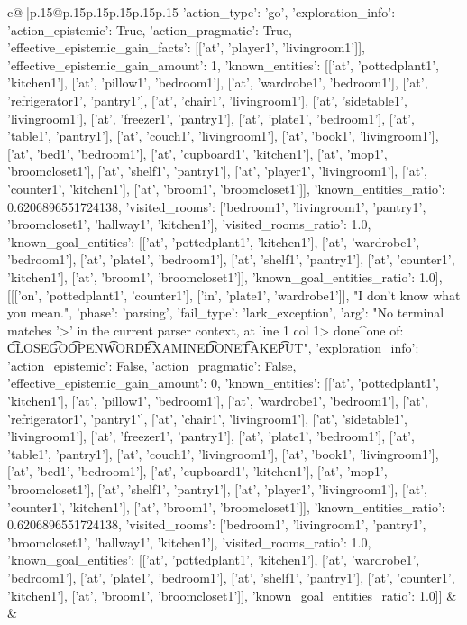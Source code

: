 \documentclass{article}
\begin{document}
{\begin{supertabular}{c@{$\;$}|p{.15\linewidth}@{}p{.15\linewidth}p{.15\linewidth}p{.15\linewidth}p{.15\linewidth}p{.15\linewidth}}
{{{{'action_type': 'go', 'exploration_info': {'action_epistemic': True, 'action_pragmatic': True, 'effective_epistemic_gain_facts': [['at', 'player1', 'livingroom1']], 'effective_epistemic_gain_amount': 1, 'known_entities': [['at', 'pottedplant1', 'kitchen1'], ['at', 'pillow1', 'bedroom1'], ['at', 'wardrobe1', 'bedroom1'], ['at', 'refrigerator1', 'pantry1'], ['at', 'chair1', 'livingroom1'], ['at', 'sidetable1', 'livingroom1'], ['at', 'freezer1', 'pantry1'], ['at', 'plate1', 'bedroom1'], ['at', 'table1', 'pantry1'], ['at', 'couch1', 'livingroom1'], ['at', 'book1', 'livingroom1'], ['at', 'bed1', 'bedroom1'], ['at', 'cupboard1', 'kitchen1'], ['at', 'mop1', 'broomcloset1'], ['at', 'shelf1', 'pantry1'], ['at', 'player1', 'livingroom1'], ['at', 'counter1', 'kitchen1'], ['at', 'broom1', 'broomcloset1']], 'known_entities_ratio': 0.6206896551724138, 'visited_rooms': ['bedroom1', 'livingroom1', 'pantry1', 'broomcloset1', 'hallway1', 'kitchen1'], 'visited_rooms_ratio': 1.0, 'known_goal_entities': [['at', 'pottedplant1', 'kitchen1'], ['at', 'wardrobe1', 'bedroom1'], ['at', 'plate1', 'bedroom1'], ['at', 'shelf1', 'pantry1'], ['at', 'counter1', 'kitchen1'], ['at', 'broom1', 'broomcloset1']], 'known_goal_entities_ratio': 1.0}}], [[['on', 'pottedplant1', 'counter1'], ['in', 'plate1', 'wardrobe1']], "I don't know what you mean.", {'phase': 'parsing', 'fail_type': 'lark_exception', 'arg': "No terminal matches '>' in the current parser context, at line 1 col 1\n\n> done\n^\nExpected one of: \n\t* CLOSE\n\t* GO\n\t* OPEN\n\t* WORD\n\t* EXAMINE\n\t* DONE\n\t* TAKE\n\t* PUT\n", 'exploration_info': {'action_epistemic': False, 'action_pragmatic': False, 'effective_epistemic_gain_amount': 0, 'known_entities': [['at', 'pottedplant1', 'kitchen1'], ['at', 'pillow1', 'bedroom1'], ['at', 'wardrobe1', 'bedroom1'], ['at', 'refrigerator1', 'pantry1'], ['at', 'chair1', 'livingroom1'], ['at', 'sidetable1', 'livingroom1'], ['at', 'freezer1', 'pantry1'], ['at', 'plate1', 'bedroom1'], ['at', 'table1', 'pantry1'], ['at', 'couch1', 'livingroom1'], ['at', 'book1', 'livingroom1'], ['at', 'bed1', 'bedroom1'], ['at', 'cupboard1', 'kitchen1'], ['at', 'mop1', 'broomcloset1'], ['at', 'shelf1', 'pantry1'], ['at', 'player1', 'livingroom1'], ['at', 'counter1', 'kitchen1'], ['at', 'broom1', 'broomcloset1']], 'known_entities_ratio': 0.6206896551724138, 'visited_rooms': ['bedroom1', 'livingroom1', 'pantry1', 'broomcloset1', 'hallway1', 'kitchen1'], 'visited_rooms_ratio': 1.0, 'known_goal_entities': [['at', 'pottedplant1', 'kitchen1'], ['at', 'wardrobe1', 'bedroom1'], ['at', 'plate1', 'bedroom1'], ['at', 'shelf1', 'pantry1'], ['at', 'counter1', 'kitchen1'], ['at', 'broom1', 'broomcloset1']], 'known_goal_entities_ratio': 1.0}}]] 
	  } 
	   } 
	   } 
	 & & \\ 
 


\end{supertabular}}
\end{document}
